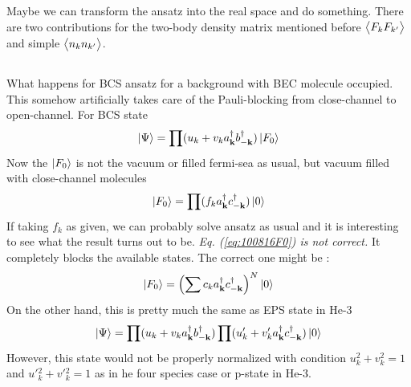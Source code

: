 Maybe we can transform the ansatz into the real space and do something.  There are two contributions for the two-body density matrix mentioned before $\bigl<{F_{k}F_{k'}}\bigr>$ and simple $\bigl<{n_{k}n_{k'}}\bigr>$.  


\subsection{}
What happens for BCS ansatz for a background with BEC molecule occupied.  This somehow artificially takes care of the Pauli-blocking from close-channel to open-channel. For BCS state
\begin{equation}\label{eq:100816:BcsBlock}
\left|\Psi\right>=\prod(u_{k}+v_{k}a^{\dagger}_{\mathbf{k}}b^{\dagger}_{-\mathbf{k}})\left|F_{0}\right>
\end{equation}
Now the $\left|F_{0}\right>$ is not the vacuum or filled fermi-sea as usual, but vacuum filled with close-channel molecules
\begin{equation}\label{eq:100816F0}
\left|F_{0}\right>=\prod(f_{k}a^{\dagger}_{\mathbf{k}}c^{\dagger}_{-\mathbf{k}})\left|0\right>
\end{equation}
If taking $f_{k}$ as given, we can probably solve ansatz as usual and it is interesting to see what the result turns out to be.  
\emph{Eq. (\ref{eq:100816F0}) is not correct. } It  completely blocks the available states.  The correct one might be :
\begin{equation}\label{eq:100816:F0N}
\left|F_{0}\right>=\left(\sum{c_{k}a^{\ensuremath{\dagger}}_{\ensuremath{\mathbf{k}}}c^{\ensuremath{\dagger}}_{-\ensuremath{\mathbf{k}}}}\right)^{N}\left|0\right>	
\end{equation}
On the other hand, this is pretty much the same as EPS state in He-3
\begin{equation}
\left|\Psi\right>=\prod(u_{k}+v_{k}a^{\dagger}_{\mathbf{k}}b^{\dagger}_{-\mathbf{k}})\prod(u'_{k}+v'_{k}a^{\dagger}_{\mathbf{k}}c^{\dagger}_{-\mathbf{k}})\left|0\right>
\end{equation}
However, this state would  not be properly normalized with condition $u_{k}^{2}+v_{k}^{2}=1$ and $u' {}_{k}^{2}+v' {}_{k}^{2}=1$ as in he four species case or p-state in He-3.   